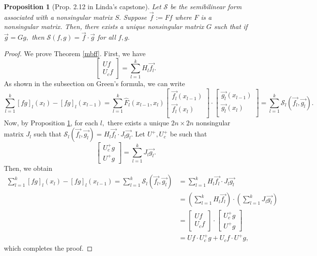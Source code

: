 \documentclass[11pt,reqno,oneside,a4paper]{article}
\theoremstyle{plain} %
\newtheorem{proposition}{Proposition}
\theoremstyle{definition}
\theoremstyle{remark}
\begin{document}
\begin{proposition}[Prop. 2.12 in Linda's capstone]\label{linfan-2.12}
Let $\mathcal{S}$ be the semibilinear form associated with a nonsingular matrix $S.$ Suppose $\vec{f} := Ff$ where $F$ is a nonsingular matrix. Then, there exists a unique nonsingular matrix $G$ such that if $\vec{g} =Gg,$ then $\mathcal{S}(f,g) = \vec{f}\cdot \vec{g}$ for all $f,g.$
\end{proposition}
\begin{proof}
We prove Theorem \ref{mbff}. 
First, we have 
\[ 
\begin{bmatrix}
Uf \\
U_c f
\end{bmatrix} = \sum^k_{l=1}
H_l \vec{f_l}.
\]
As shown in the subsection on Green's formula, we can write 
\[ 
\sum_{l=1}^{k} [fg]_l(x_l) - [fg]_l(x_{l-1}) =  \sum_{l=1}^{k} \widehat{F}_l(x_{l-1}, x_l) \begin{bmatrix}
\vec{f_l}(x_{l-1})  \\
\vec{f_l}(x_{l})  \\
\end{bmatrix}
\cdot
\begin{bmatrix}
\vec{g_l}(x_{l-1})  \\
\vec{g_l}(x_{l})  \\
\end{bmatrix}   = \sum_{l=1}^{k}  \mathcal{S}_l (\vec{f_l}, \vec{g_l}).
\]
Now, by Proposition \ref{linfan-2.12}, for each $l,$ there exists a unique $2n\times 2n$ nonsingular matrix $J_l$ such that $\mathcal{S}_l (\vec{f_l}, \vec{g_l}) = H_l \vec{f_l} \cdot J_l \vec{g_l}.$ Let $U^+, U^+_c$ be such that 
\[
\begin{bmatrix}
U^+_cg \\
U^+ g
\end{bmatrix} = \sum^k_{l=1}
J_l \vec{g_l}.
\]
Then, we obtain 
\begin{align*}
\sum_{l=1}^{k} [fg]_l(x_l) - [fg]_l(x_{l-1})  =  \sum_{l=1}^{k}  \mathcal{S}_l (\vec{f_l}, \vec{g_l}) &= \sum_{l=1}^{k}  H_l \vec{f_l} \cdot J_l \vec{g_l} \\
&= \left( \sum_{l=1}^{k}  H_l \vec{f_l}\right) \cdot \left( \sum_{l=1}^{k}  J_l \vec{g_l} \right) \\
&= \begin{bmatrix}
Uf \\
U_c f
\end{bmatrix} \cdot 
\begin{bmatrix}
U^+_cg \\
U^+ g
\end{bmatrix} \\
&=  Uf\cdot U^+_c g + U_c f \cdot U^+ g,
\end{align*}
which completes the proof.
\end{proof}
\end{document}
